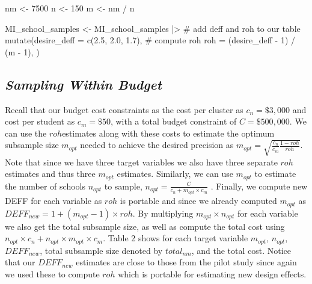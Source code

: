 \documentclass[
  12pt]{article}
\newenvironment{Shaded}{\begin{snugshade}}{\end{snugshade}}
\newcommand{\AttributeTok}[1]{\textcolor[rgb]{0.40,0.45,0.13}{#1}}
\newcommand{\CommentTok}[1]{\textcolor[rgb]{0.37,0.37,0.37}{#1}}
\newcommand{\DecValTok}[1]{\textcolor[rgb]{0.68,0.00,0.00}{#1}}
\newcommand{\FloatTok}[1]{\textcolor[rgb]{0.68,0.00,0.00}{#1}}
\newcommand{\FunctionTok}[1]{\textcolor[rgb]{0.28,0.35,0.67}{#1}}
\newcommand{\NormalTok}[1]{\textcolor[rgb]{0.00,0.23,0.31}{#1}}
\newcommand{\OtherTok}[1]{\textcolor[rgb]{0.00,0.23,0.31}{#1}}
\newcommand{\SpecialCharTok}[1]{\textcolor[rgb]{0.37,0.37,0.37}{#1}}
\begin{document}
\begin{Shaded}
\begin{Highlighting}[]
\NormalTok{nm }\OtherTok{\textless{}{-}} \DecValTok{7500}
\NormalTok{n }\OtherTok{\textless{}{-}} \DecValTok{150}
\NormalTok{m }\OtherTok{\textless{}{-}}\NormalTok{ nm }\SpecialCharTok{/}\NormalTok{ n}

\NormalTok{MI\_school\_samples }\OtherTok{\textless{}{-}}\NormalTok{ MI\_school\_samples }\SpecialCharTok{|\textgreater{}} 
  \CommentTok{\# add deff and roh to our table}
  \FunctionTok{mutate}\NormalTok{(}\AttributeTok{desire\_deff =} \FunctionTok{c}\NormalTok{(}\FloatTok{2.5}\NormalTok{, }\FloatTok{2.0}\NormalTok{, }\FloatTok{1.7}\NormalTok{),}
         \CommentTok{\# compute roh}
         \AttributeTok{roh =}\NormalTok{ (desire\_deff }\SpecialCharTok{{-}} \DecValTok{1}\NormalTok{) }\SpecialCharTok{/}\NormalTok{ (m }\SpecialCharTok{{-}} \DecValTok{1}\NormalTok{),}
\NormalTok{         )}
\end{Highlighting}
\end{Shaded}

\subsection{\texorpdfstring{\emph{Sampling Within
Budget}}{Sampling Within Budget}}\label{sampling-within-budget}

Recall that our budget cost constraints as the cost per cluster as
\(c_n = \$3,000\) and cost per student as \(c_m = \$50\), with a total
budget constraint of \(C = \$500,000\). We can use the \(roh\)estimates
along with these costs to estimate the optimum subsample size
\(m_{opt}\) needed to achieve the desired precision as
\(m_{opt} = \sqrt{\frac{c_n}{c_m} \frac{1-roh}{roh}}\). Note that since
we have three target variables we also have three separate \(roh\)
estimates and thus three \(m_{opt}\) estimates. Similarly, we can use
\(m_{opt}\) to estimate the number of schools \(n_{opt}\) to sample,
\(n_{opt} = \frac{C}{c_n + m_{opt} \times c_m}\) . Finally, we compute
new DEFF for each variable as \(roh\) is portable and since we already
computed \(m_{opt}\) as \(DEFF_{new} = 1 + (m_{opt} - 1) \times roh\).
By multiplying \(m_{opt} \times n_{opt}\) for each variable we also get
the total subsample size, as well as compute the total cost using
\(n_{opt} \times c_n + n_{opt} \times m_{opt} \times c_m\). Table 2
shows for each target variable \(m_{opt}\), \(n_{opt}\), \(DEFF_{new}\),
total subsample size denoted by \(total_{nm}\), and the total cost.
Notice that our \(DEFF_{new}\) estimates are close to those from the
pilot study since again we used these to compute \(roh\) which is
portable for estimating new design effects.
\end{document}
